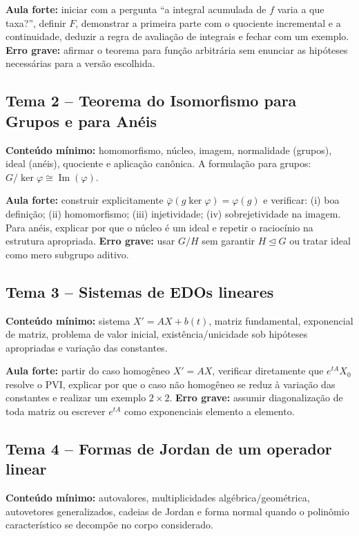 \documentclass[11pt,a4paper]{article}
\begin{document}
\textbf{Aula forte:} iniciar com a pergunta ``a integral acumulada de $f$ varia a que taxa?'', definir $F$, demonstrar a primeira parte com o quociente incremental e a continuidade, deduzir a regra de avaliação de integrais e fechar com um exemplo. \textbf{Erro grave:} afirmar o teorema para função arbitrária sem enunciar as hipóteses necessárias para a versão escolhida.

\subsection{Tema 2 -- Teorema do Isomorfismo para Grupos e para Anéis}
\textbf{Conteúdo mínimo:} homomorfismo, núcleo, imagem, normalidade (grupos), ideal (anéis), quociente e aplicação canônica. A formulação para grupos: $G/\ker\varphi\cong\operatorname{Im}(\varphi)$.

\textbf{Aula forte:} construir explicitamente $\bar\varphi(g\ker\varphi)=\varphi(g)$ e verificar: (i) boa definição; (ii) homomorfismo; (iii) injetividade; (iv) sobrejetividade na imagem. Para anéis, explicar por que o núcleo é um ideal e repetir o raciocínio na estrutura apropriada. \textbf{Erro grave:} usar $G/H$ sem garantir $H\trianglelefteq G$ ou tratar ideal como mero subgrupo aditivo.

\subsection{Tema 3 -- Sistemas de EDOs lineares}
\textbf{Conteúdo mínimo:} sistema $X'=AX+b(t)$, matriz fundamental, exponencial de matriz, problema de valor inicial, existência/unicidade sob hipóteses apropriadas e variação das constantes.

\textbf{Aula forte:} partir do caso homogêneo $X'=AX$, verificar diretamente que $e^{tA}X_0$ resolve o PVI, explicar por que o caso não homogêneo se reduz à variação das constantes e realizar um exemplo $2\times2$. \textbf{Erro grave:} assumir diagonalização de toda matriz ou escrever $e^{tA}$ como exponenciais elemento a elemento.

\subsection{Tema 4 -- Formas de Jordan de um operador linear}
\textbf{Conteúdo mínimo:} autovalores, multiplicidades algébrica/geométrica, autovetores generalizados, cadeias de Jordan e forma normal quando o polinômio característico se decompõe no corpo considerado.
\end{document}
